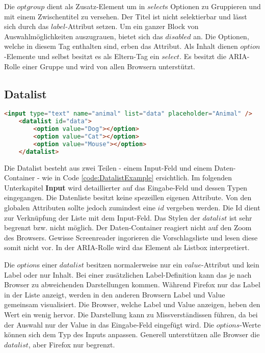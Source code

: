 Die $optgroup$ dient als Zusatz-Element um in $select$s Optionen zu Gruppieren und mit einem Zwischentitel zu versehen.
Der Titel ist nicht selektierbar und lässt sich durch das $label$-Attribut setzen. 
Um ein ganzer Block von Auswahlmöglichkeiten auszugrauen, bietet sich das $disabled$ an.
Die Optionen, welche in diesem Tag enthalten sind, erben das Attribut.
Als Inhalt dienen $option$-Elemente und selbst besitzt es als Eltern-Tag ein $select$.
Es besitzt die ARIA-Rolle einer Gruppe und wird von allen Browsern unterstützt.


\subsection{Datalist}

\begin{lstlisting}[language = html, caption = Code: Datalist Example, label = code:DatalistExample]
    <input type="text" name="animal" list="data" placeholder="Animal" />
    <datalist id="data">
        <option value="Dog"></option>
        <option value="Cat"></option>
        <option value="Mouse"></option>
    </datalist>
\end{lstlisting}

Die Datalist besteht aus zwei Teilen - einem Input-Feld und einem Daten-Container - wie in Code \ref{code:DatalistExample} ersichtlich. 
Im folgenden Unterkapitel \textbf{Input} wird detaillierter auf das Eingabe-Feld und dessen Typen eingegangen.
Die Datenliste besitzt keine spezeillen eigenen Attribute.
Von den globalen Attributen sollte jedoch zumindest eine $id$ vergeben werden.
Die Id dient zur Verknüpfung der Liste mit dem Input-Feld. 
Das Stylen der $datalist$ ist sehr begrenzt bzw. nicht möglich. 
Der Daten-Container reagiert nicht auf den Zoom des Browsers.
Gewisse Screenreader ingorieren die Vorschlagsliste und lesen diese somit nicht vor.
In der ARIA-Rolle wird das Element als Listbox interpretiert.

Die $option$s einer $datalist$ besitzen normalerweise nur ein $value$-Attribut und kein Label oder nur Inhalt.
Bei einer zusätzlichen Label-Definition kann das je nach Browser zu abweichenden Darstellungen kommen. 
Während Firefox nur das Label in der Liste anzeigt, werden in den anderen Browsern Label und Value gemeinsam visualisiert. 
Die Browser, welche Label und Value anzeigen, heben den Wert ein wenig hervor.
Die Darstellung kann zu Missverständissen führen, da bei der Auswahl nur der Value in das Eingabe-Feld eingefügt wird. 
Die $options$-Werte können sich dem Typ des Inputs anpassen. 
Generell unterstützen alle Browser die $datalist$, aber Firefox nur begrenzt.

